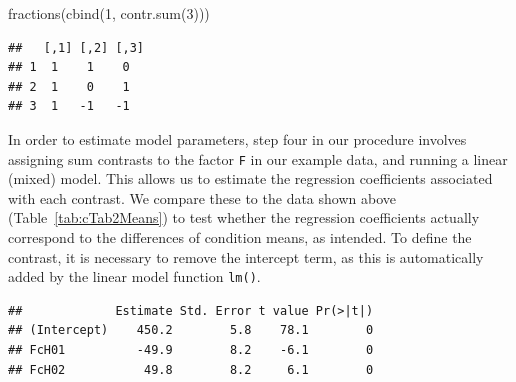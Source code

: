 \documentclass[
  12pt,
]{krantz}
\newenvironment{Shaded}{\begin{snugshade}}{\end{snugshade}}
\newcommand{\AttributeTok}[1]{\textcolor[rgb]{0.77,0.63,0.00}{#1}}
\newcommand{\DecValTok}[1]{\textcolor[rgb]{0.00,0.00,0.81}{#1}}
\newcommand{\FunctionTok}[1]{\textcolor[rgb]{0.00,0.00,0.00}{#1}}
\newcommand{\NormalTok}[1]{#1}
\newcommand{\OtherTok}[1]{\textcolor[rgb]{0.56,0.35,0.01}{#1}}
\newcommand{\SpecialCharTok}[1]{\textcolor[rgb]{0.00,0.00,0.00}{#1}}
\theoremstyle{definition}
\theoremstyle{definition}
\theoremstyle{definition}
\theoremstyle{definition}
\theoremstyle{remark}
\begin{document}
\begin{Shaded}
\begin{Highlighting}[]
\FunctionTok{fractions}\NormalTok{(}\FunctionTok{cbind}\NormalTok{(}\DecValTok{1}\NormalTok{, }\FunctionTok{contr.sum}\NormalTok{(}\DecValTok{3}\NormalTok{)))}
\end{Highlighting}
\end{Shaded}

\begin{verbatim}
##   [,1] [,2] [,3]
## 1  1    1    0  
## 2  1    0    1  
## 3  1   -1   -1
\end{verbatim}

In order to estimate model parameters, step four in our procedure involves assigning sum contrasts to the factor \texttt{F} in our example data, and running a linear (mixed) model. This allows us to estimate the regression coefficients associated with each contrast. We compare these to the data shown above (Table~\ref{tab:cTab2Means}) to test whether the regression coefficients actually correspond to the differences of condition means, as intended. To define the contrast, it is necessary to remove the intercept term, as this is automatically added by the linear model function \texttt{lm()}.

\begin{Shaded}
\end{Shaded}

\begin{Shaded}
\end{Shaded}

\begin{verbatim}
##             Estimate Std. Error t value Pr(>|t|)
## (Intercept)    450.2        5.8    78.1        0
## FcH01          -49.9        8.2    -6.1        0
## FcH02           49.8        8.2     6.1        0
\end{verbatim}
\end{document}
